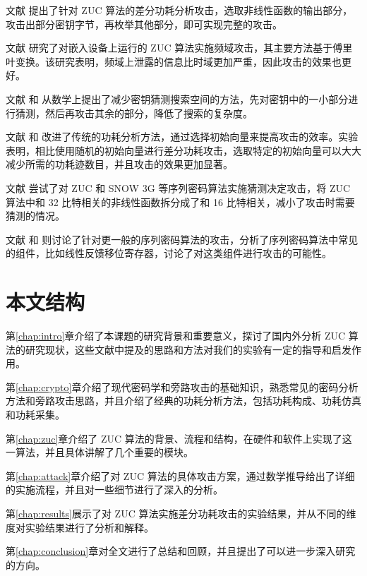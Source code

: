 文献 \parencite{zuc_attack_tangming} 提出了针对 ZUC 算法的差分功耗分析攻击，选取非线性函数的输出部分，攻击出部分密钥字节，再枚举其他部分，即可实现完整的攻击。

文献 \parencite{zuc_freq} 研究了对嵌入设备上运行的 ZUC 算法实施频域攻击，其主要方法基于傅里叶变换。该研究表明，频域上泄露的信息比时域更加严重，因此攻击的效果也更好。

文献 \parencite{zuc_security} 和 \parencite{zuc_analyical} 从数学上提出了减少密钥猜测搜索空间的方法，先对密钥中的一小部分进行猜测，然后再攻击其余的部分，降低了搜索的复杂度。

文献 \parencite{zuc_iv} 和 \parencite{zuc_wu}改进了传统的功耗分析方法，通过选择初始向量来提高攻击的效率。实验表明，相比使用随机的初始向量进行差分功耗攻击，选取特定的初始向量可以大大减少所需的功耗迹数目，并且攻击的效果更加显著。

文献 \parencite{zuc_guess} 尝试了对 ZUC 和 SNOW 3G 等序列密码算法实施猜测决定攻击，将 ZUC 算法中和 32 比特相关的非线性函数拆分成了和 16 比特相关，减小了攻击时需要猜测的情况。

文献 \parencite{stream_fischer} 和 \parencite{stream_gu} 则讨论了针对更一般的序列密码算法的攻击，分析了序列密码算法中常见的组件，比如线性反馈移位寄存器，讨论了对这类组件进行攻击的可能性。

\section{本文结构}

第\ref{chap:intro}章介绍了本课题的研究背景和重要意义，探讨了国内外分析 ZUC 算法的研究现状，这些文献中提及的思路和方法对我们的实验有一定的指导和启发作用。

第\ref{chap:crypto}章介绍了现代密码学和旁路攻击的基础知识，熟悉常见的密码分析方法和旁路攻击思路，并且介绍了经典的功耗分析方法，包括功耗构成、功耗仿真和功耗采集。

第\ref{chap:zuc}章介绍了 ZUC 算法的背景、流程和结构，在硬件和软件上实现了这一算法，并且具体讲解了几个重要的模块。

第\ref{chap:attack}章介绍了对 ZUC 算法的具体攻击方案，通过数学推导给出了详细的实施流程，并且对一些细节进行了深入的分析。

第\ref{chap:results}展示了对 ZUC 算法实施差分功耗攻击的实验结果，并从不同的维度对实验结果进行了分析和解释。

第\ref{chap:conclusion}章对全文进行了总结和回顾，并且提出了可以进一步深入研究的方向。

